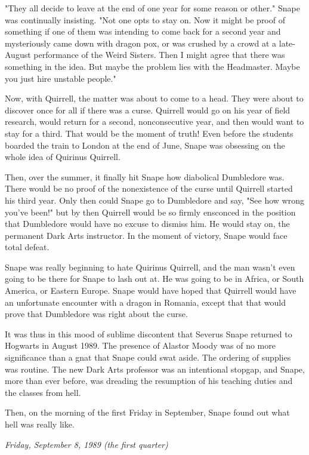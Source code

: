 \documentclass[a4paper,11pt]{article}
\begin{document}
"They all decide to leave at the end of one year for some reason or other." Snape was continually insisting. "Not one opts to stay on. Now it might be proof of something if one of them was intending to come back for a second year and mysteriously came down with dragon pox, or was crushed by a crowd at a late-August performance of the Weird Sisters. Then I might agree that there was something in the idea. But maybe the problem lies with the Headmaster. Maybe you just hire unstable people."

Now, with Quirrell, the matter was about to come to a head. They were about to discover once for all if there was a curse. Quirrell would go on his year of field research, would return for a second, nonconsecutive year, and then would want to stay for a third. That would be the moment of truth! Even before the students boarded the train to London at the end of June, Snape was obsessing on the whole idea of Quirinus Quirrell.

Then, over the summer, it finally hit Snape how diabolical Dumbledore was. There would be no proof of the nonexistence of the curse until Quirrell started his third year. Only then could Snape go to Dumbledore and say, "See how wrong you've been!" but by then Quirrell would be so firmly ensconced in the position that Dumbledore would have no excuse to dismiss him. He would stay on, the permanent Dark Arts instructor. In the moment of victory, Snape would face total defeat.

Snape was really beginning to hate Quirinus Quirrell, and the man wasn't even going to be there for Snape to lash out at. He was going to be in Africa, or South America, or Eastern Europe. Snape would have hoped that Quirrell would have an unfortunate encounter with a dragon in Romania, except that that would prove that Dumbledore was right about the curse.

It was thus in this mood of sublime discontent that Severus Snape returned to Hogwarts in August 1989. The presence of Alastor Moody was of no more significance than a gnat that Snape could swat aside. The ordering of supplies was routine. The new Dark Arts professor was an intentional stopgap, and Snape, more than ever before, was dreading the resumption of his teaching duties and the classes from hell.

Then, on the morning of the first Friday in September, Snape found out what hell was really like.

\emph{Friday, September 8, 1989 (the first quarter)}
\end{document}
